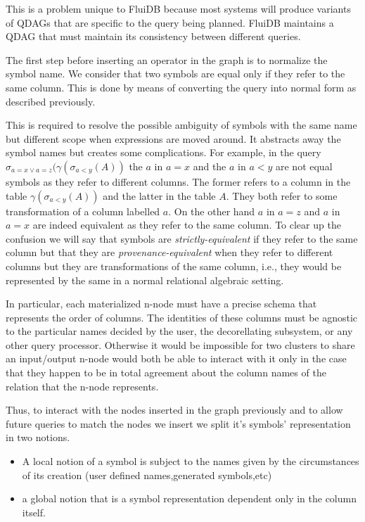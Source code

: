 This is a problem unique to FluiDB because most systems will produce
variants of QDAGs that are specific to the query being planned. FluiDB
maintains a QDAG that must maintain its consistency between different
queries.

The first step before inserting an operator in the graph is to
normalize the symbol name. We consider that two symbols are equal only
if they refer to the same column. This is done by means of
converting the query into normal form as described previously.

This is required to resolve the possible ambiguity of symbols with the
same name but different scope when expressions are moved around. It
abstracts away the symbol names but creates some complications. For
example, in the query \(\sigma_{a=x \lor
a=z}(\gamma(\sigma_{a<y}(A))\) the \(a\) in \(a=x\) and the \(a\) in
\(a < y\) are not equal symbols as they refer to different
columns. The former refers to a column in the table
\(\gamma(\sigma_{a<y}(A))\) and the latter in the table \(A\). They
both refer to some transformation of a column labelled \(a\). On the
other hand \(a\) in \(a=z\) and \(a\) in \(a=x\) are indeed equivalent
as they refer to the same column. To clear up the confusion we will
say that symbols are \emph{strictly-equivalent} if they refer to the
same column but that they are \emph{provenance-equivalent} when they
refer to different columns but they are transformations of the same
column, i.e., they would be represented by the same in a normal
relational algebraic setting.

In particular, each materialized n-node must have a precise schema
that represents the order of columns. The identities of these columns
must be agnostic to the particular names decided by the user, the
decorellating subsystem, or any other query processor. Otherwise it
would be impossible for two clusters to share an input/output n-node
would both be able to interact with it only in the case that they
happen to be in total agreement about the column names of the relation
that the n-node represents.

Thus, to interact with the nodes inserted in the graph previously and
to allow future queries to match the nodes we insert we split it's
symbols' representation in two notions.

\begin{itemize}
\item A local notion of a symbol is subject to the names given by the
  circumstances of its creation (user defined names,generated
  symbols,etc)
\item a global notion that is a symbol representation dependent only
  in the column itself.
\end{itemize}

